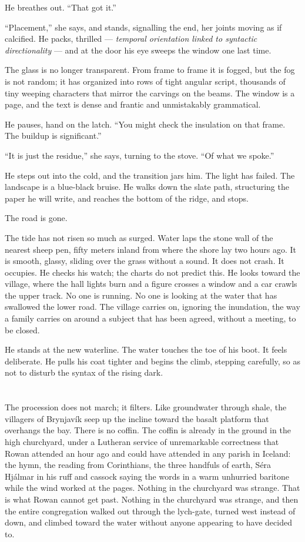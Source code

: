 \documentclass[11pt,oneside]{book}
\begin{document}
He breathes out. ``That got it.''

``Placement,'' she says, and stands, signalling the end, her joints
moving as if calcified. He packs, thrilled --- \emph{temporal
orientation linked to syntactic directionality} --- and at the door his
eye sweeps the window one last time.

The glass is no longer transparent. From frame to frame it is fogged,
but the fog is not random; it has organized into rows of tight angular
script, thousands of tiny weeping characters that mirror the carvings on
the beams. The window is a page, and the text is dense and frantic and
unmistakably grammatical.

He pauses, hand on the latch. ``You might check the insulation on that
frame. The buildup is significant.''

``It is just the residue,'' she says, turning to the stove. ``Of what we
spoke.''

He steps out into the cold, and the transition jars him. The light has
failed. The landscape is a blue-black bruise. He walks down the slate
path, structuring the paper he will write, and reaches the bottom of the
ridge, and stops.

The road is gone.

The tide has not risen so much as surged. Water laps the stone wall of
the nearest sheep pen, fifty meters inland from where the shore lay two
hours ago. It is smooth, glassy, sliding over the grass without a sound.
It does not crash. It occupies. He checks his watch; the charts do not
predict this. He looks toward the village, where the hall lights burn
and a figure crosses a window and a car crawls the upper track. No one
is running. No one is looking at the water that has swallowed the lower
road. The village carries on, ignoring the inundation, the way a family
carries on around a subject that has been agreed, without a meeting, to
be closed.

He stands at the new waterline. The water touches the toe of his boot.
It feels deliberate. He pulls his coat tighter and begins the climb,
stepping carefully, so as not to disturb the syntax of the rising dark.

\chapter{}

The procession does not march; it filters. Like groundwater through
shale, the villagers of Brynjavík seep up the incline toward the basalt
platform that overhangs the bay. There is no coffin. The coffin is
already in the ground in the high churchyard, under a Lutheran service
of unremarkable correctness that Rowan attended an hour ago and could
have attended in any parish in Iceland: the hymn, the reading from
Corinthians, the three handfuls of earth, Séra Hjálmar in his ruff and
cassock saying the words in a warm unhurried baritone while the wind
worked at the pages. Nothing in the churchyard was strange. That is
what Rowan cannot get past. Nothing in the churchyard was strange, and
then the entire congregation walked out through the lych-gate, turned
west instead of down, and climbed toward the water without anyone
appearing to have decided to.
\end{document}
